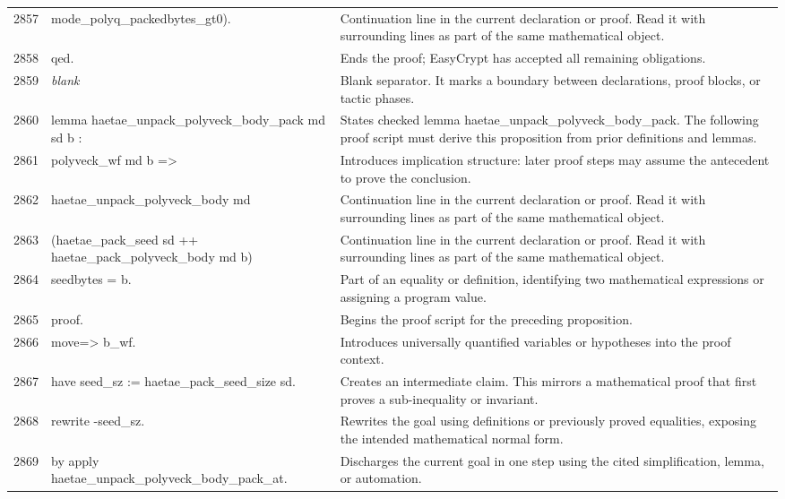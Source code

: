 \documentclass[10pt]{article}
\begin{document}
\begin{longtable}{r L{0.53\textwidth} L{0.37\textwidth}}
2857 & {\ttfamily\scriptsize        mode\_polyq\_packedbytes\_gt0).} & Continuation line in the current declaration or proof.  Read it with surrounding lines as part of the same mathematical object. \\
2858 & {\ttfamily\scriptsize qed.} & Ends the proof; EasyCrypt has accepted all remaining obligations. \\
2859 & {\ttfamily\scriptsize \emph{blank}} & Blank separator.  It marks a boundary between declarations, proof blocks, or tactic phases. \\
2860 & {\ttfamily\scriptsize lemma haetae\_unpack\_polyveck\_body\_pack md sd b :} & States checked lemma haetae\_unpack\_polyveck\_body\_pack.  The following proof script must derive this proposition from prior definitions and lemmas. \\
2861 & {\ttfamily\scriptsize   polyveck\_wf md b =>} & Introduces implication structure: later proof steps may assume the antecedent to prove the conclusion. \\
2862 & {\ttfamily\scriptsize   haetae\_unpack\_polyveck\_body md} & Continuation line in the current declaration or proof.  Read it with surrounding lines as part of the same mathematical object. \\
2863 & {\ttfamily\scriptsize     (haetae\_pack\_seed sd ++ haetae\_pack\_polyveck\_body md b)} & Continuation line in the current declaration or proof.  Read it with surrounding lines as part of the same mathematical object. \\
2864 & {\ttfamily\scriptsize     seedbytes = b.} & Part of an equality or definition, identifying two mathematical expressions or assigning a program value. \\
2865 & {\ttfamily\scriptsize proof.} & Begins the proof script for the preceding proposition. \\
2866 & {\ttfamily\scriptsize move=> b\_wf.} & Introduces universally quantified variables or hypotheses into the proof context. \\
2867 & {\ttfamily\scriptsize have seed\_sz := haetae\_pack\_seed\_size sd.} & Creates an intermediate claim.  This mirrors a mathematical proof that first proves a sub-inequality or invariant. \\
2868 & {\ttfamily\scriptsize rewrite -seed\_sz.} & Rewrites the goal using definitions or previously proved equalities, exposing the intended mathematical normal form. \\
2869 & {\ttfamily\scriptsize by apply haetae\_unpack\_polyveck\_body\_pack\_at.} & Discharges the current goal in one step using the cited simplification, lemma, or automation. \\

\end{longtable}
\end{document}

